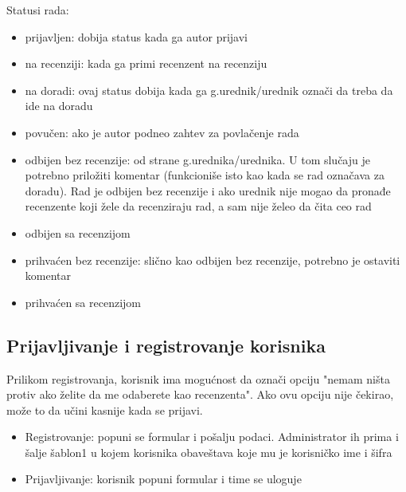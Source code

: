 \documentclass[a4paper]{article}
\begin{document}
    Statusi rada:
    \begin{itemize}
        \item prijavljen: dobija status kada ga autor prijavi
        \item na recenziji: kada ga primi recenzent na recenziju
        \item na doradi: ovaj status dobija kada ga g.urednik/urednik označi da treba da ide na doradu
        \item povučen: ako je autor podneo zahtev za povlačenje rada
        \item odbijen bez recenzije: od strane g.urednika/urednika. U tom slučaju je potrebno priložiti komentar (funkcioniše isto kao kada se rad označava za doradu). Rad je odbijen bez recenzije i ako urednik nije mogao da pronađe recenzente koji žele da recenziraju rad, a sam nije želeo da čita ceo rad
        \item odbijen sa recenzijom
        \item prihvaćen bez recenzije: slično kao odbijen bez recenzije, potrebno je ostaviti komentar
        \item prihvaćen sa recenzijom
    \end{itemize}


\subsection{Prijavljivanje i registrovanje korisnika}
Prilikom registrovanja, korisnik ima mogućnost da označi opciju "nemam ništa protiv ako želite da me odaberete kao recenzenta". Ako ovu opciju nije čekirao, može to da učini kasnije kada se prijavi.
\begin{itemize}
    \item Registrovanje: popuni se formular i pošalju podaci. Administrator ih prima i šalje šablon1 u kojem korisnika obaveštava koje mu je korisničko ime i šifra
    \item Prijavljivanje: korisnik popuni formular i time se uloguje
\end{itemize}
\end{document}
